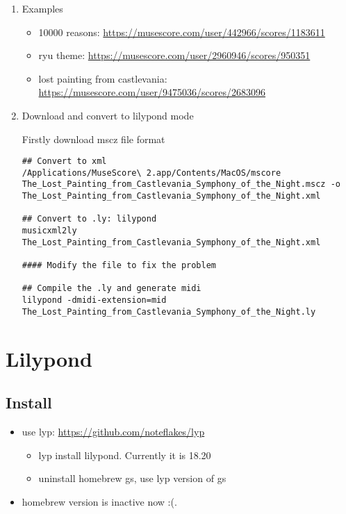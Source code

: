 \documentclass[11pt]{article}
\begin{document}
\begin{enumerate}
\item Examples
\label{sec:orga1ec7fe}

\begin{itemize}
\item 10000 reasons: \url{https://musescore.com/user/442966/scores/1183611}
\item ryu theme: \url{https://musescore.com/user/2960946/scores/950351}
\item lost painting from castlevania: \url{https://musescore.com/user/9475036/scores/2683096}
\end{itemize}

\item Download and convert to lilypond mode
\label{sec:org253ad30}

Firstly download mscz file format

\begin{verbatim}
## Convert to xml
/Applications/MuseScore\ 2.app/Contents/MacOS/mscore The_Lost_Painting_from_Castlevania_Symphony_of_the_Night.mscz -o The_Lost_Painting_from_Castlevania_Symphony_of_the_Night.xml

## Convert to .ly: lilypond
musicxml2ly The_Lost_Painting_from_Castlevania_Symphony_of_the_Night.xml

#### Modify the file to fix the problem

## Compile the .ly and generate midi
lilypond -dmidi-extension=mid The_Lost_Painting_from_Castlevania_Symphony_of_the_Night.ly 
\end{verbatim}
\end{enumerate}

\section{Lilypond}
\label{sec:orgc9ebe96}

\subsection{Install}
\label{sec:org9369ffd}

\begin{itemize}
\item use lyp: \url{https://github.com/noteflakes/lyp}
\begin{itemize}
\item lyp install lilypond. Currently it is 18.20
\item uninstall homebrew gs, use lyp version of gs
\end{itemize}
\item homebrew version is inactive now :(.
\end{itemize}
\end{document}

